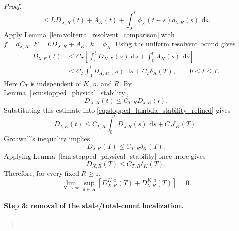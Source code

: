 \documentclass[11pt]{article}
\theoremstyle{remarkitalic}
\theoremstyle{remarkitalic}
\newcommand{\dd}{\,\mathrm d}
\newcommand{\1}{\mathbf 1}
\begin{document}
{\begin{proof}
\[\leq
L D_{X,R}(t)
+
A_K(t)
+
\int_0^t
\bar\phi_K(t-s)
d_{\lambda,R}(s)\,\dd s.
\] Apply Lemma~\ref{lem:volterra_resolvent_comparison} with $ f=d_{\lambda,R},
    \;  F=L D_{X,R}+A_K,
    \;
    k=\bar\phi_K.$
Using the uniform resolvent bound gives
\begin{align}
D_{\lambda,R}(t)
&\leq
C_T
\left[
    \int_0^tD_{X,R}(s)\,\dd s
    +
    \int_0^tA_K(s)\,\dd s
\right]
\nonumber\\
&\leq
C_T\int_0^tD_{X,R}(s)\,\dd s
+
C_T\delta_K(T),
\qquad 0\leq t\leq T.
\label{eq:stopped_lambda_stability_refined}
\end{align}
Here $C_T$ is independent of $K$, $a$, and $R$. By Lemma~\ref{lem:stopped_physical_stability},
\[
D_{X,R}(t)
\leq
C_{T,R}D_{\lambda,R}(t).
\]
Substituting this estimate into
\eqref{eq:stopped_lambda_stability_refined} gives
\[
D_{\lambda,R}(t)
\leq
C_{T,R}
\int_0^tD_{\lambda,R}(s)\,\dd s
+
C_T\delta_K(T).
\]
Gronwall's inequality implies
\[
D_{\lambda,R}(T)
\leq
C_{T,R}\delta_K(T).
\]
Applying Lemma~\ref{lem:stopped_physical_stability} once more gives
\[
D_{X,R}(T)
\leq
C_{T,R}\delta_K(T).
\]
Therefore, for every fixed $R\geq1$,
\begin{equation}
\label{eq:fixed_R_refined_convergence}
\lim_{K\to\infty}
\sup_{a\in\mathcal A}
\left[
    D_{X,R}^{K,a}(T)
    +
    D_{\lambda,R}^{K,a}(T)
\right]
=0.
\end{equation}

\paragraph{Step 3: removal of the state/total-count localization.}


\end{proof}}
\end{document}
